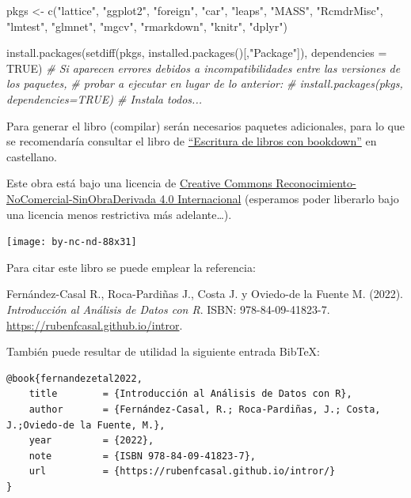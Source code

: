 \documentclass[
]{book}
\newenvironment{Shaded}{\begin{snugshade}}{\end{snugshade}}
\newcommand{\AttributeTok}[1]{\textcolor[rgb]{0.77,0.63,0.00}{#1}}
\newcommand{\CommentTok}[1]{\textcolor[rgb]{0.56,0.35,0.01}{\textit{#1}}}
\newcommand{\ConstantTok}[1]{\textcolor[rgb]{0.00,0.00,0.00}{#1}}
\newcommand{\FunctionTok}[1]{\textcolor[rgb]{0.00,0.00,0.00}{#1}}
\newcommand{\NormalTok}[1]{#1}
\newcommand{\OtherTok}[1]{\textcolor[rgb]{0.56,0.35,0.01}{#1}}
\newcommand{\StringTok}[1]{\textcolor[rgb]{0.31,0.60,0.02}{#1}}
\theoremstyle{break}
\begin{document}
\begin{Shaded}
\begin{Highlighting}[]
\NormalTok{pkgs }\OtherTok{\textless{}{-}} \FunctionTok{c}\NormalTok{(}\StringTok{"lattice"}\NormalTok{, }\StringTok{"ggplot2"}\NormalTok{, }\StringTok{"foreign"}\NormalTok{, }\StringTok{"car"}\NormalTok{, }\StringTok{"leaps"}\NormalTok{, }\StringTok{"MASS"}\NormalTok{, }\StringTok{"RcmdrMisc"}\NormalTok{, }
          \StringTok{"lmtest"}\NormalTok{, }\StringTok{"glmnet"}\NormalTok{, }\StringTok{"mgcv"}\NormalTok{, }\StringTok{"rmarkdown"}\NormalTok{, }\StringTok{"knitr"}\NormalTok{, }\StringTok{"dplyr"}\NormalTok{)}

\FunctionTok{install.packages}\NormalTok{(}\FunctionTok{setdiff}\NormalTok{(pkgs, }\FunctionTok{installed.packages}\NormalTok{()[,}\StringTok{"Package"}\NormalTok{]), }\AttributeTok{dependencies =} \ConstantTok{TRUE}\NormalTok{)}
\CommentTok{\# Si aparecen errores debidos a incompatibilidades entre las versiones de los paquetes, }
\CommentTok{\# probar a ejecutar en lugar de lo anterior:}
\CommentTok{\# install.packages(pkgs, dependencies=TRUE) \# Instala todos...}
\end{Highlighting}
\end{Shaded}

Para generar el libro (compilar) serán necesarios paquetes adicionales,
para lo que se recomendaría consultar el libro de \href{https://rubenfcasal.github.io/bookdown_intro}{``Escritura de libros con bookdown''} en castellano.

Este obra está bajo una licencia de \href{https://creativecommons.org/licenses/by-nc-nd/4.0/deed.es_ES}{Creative Commons Reconocimiento-NoComercial-SinObraDerivada 4.0 Internacional}
(esperamos poder liberarlo bajo una licencia menos restrictiva más adelante\ldots).

\texttt{[image: by-nc-nd-88x31]}

Para citar este libro se puede emplear la referencia:

Fernández-Casal R., Roca-Pardiñas J., Costa J. y Oviedo-de la Fuente M. (2022). \emph{Introducción al Análisis de Datos con R}. ISBN: 978-84-09-41823-7. \url{https://rubenfcasal.github.io/intror}.

También puede resultar de utilidad la siguiente entrada BibTeX:

\begin{verbatim}
@book{fernandezetal2022,
    title        = {Introducción al Análisis de Datos con R},
    author       = {Fernández-Casal, R.; Roca-Pardiñas, J.; Costa, J.;Oviedo-de la Fuente, M.},
    year         = {2022},
    note         = {ISBN 978-84-09-41823-7},
    url          = {https://rubenfcasal.github.io/intror/}
}
\end{verbatim}
\end{document}
